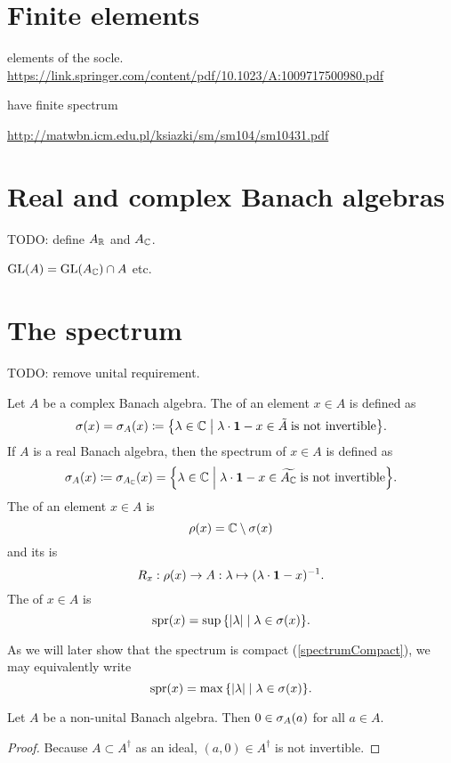 \section{Finite elements}
elements of the socle. \url{https://link.springer.com/content/pdf/10.1023/A:1009717500980.pdf}

have finite spectrum 

\url{http://matwbn.icm.edu.pl/ksiazki/sm/sm104/sm10431.pdf}

\section{Real and complex Banach algebras}
TODO: define $A_{\mathbb{R}}$ and $A_{\mathbb{C}}$.

\begin{proposition} \label{preservationAlgebraicPropertiesComplexificationRealification}
$\operatorname{GL}(A) = \operatorname{GL}(A_{\mathbb{C}})\cap A$ etc.
\end{proposition}

\section{The spectrum}
TODO: remove unital requirement.
\begin{definition}
Let $A$ be a complex Banach algebra. The  of an element $x\in A$ is defined as
\[ \spec(x) = \spec_A(x) \defeq \setbuilder{\lambda\in\C}{\lambda\cdot \vec{1} - x \in \tilde{A} \;\text{is not invertible}}. \]
If $A$ is a real Banach algebra, then the spectrum of $x\in A$ is defined as
\[ \spec_A(x) \defeq \spec_{A_\C}(x) = \setbuilder{\lambda\in\C}{\lambda\cdot \vec{1} - x \in \widetilde{A_\C} \;\text{is not invertible}}.  \]
The  of an element $x\in A$ is
\[ \rho(x) = \mathbb{C}\setminus\sigma(x) \]
and its  is
\[ R_x: \rho(x) \to A : \lambda\mapsto (\lambda\cdot\boldsymbol{\mathrm{1}}  - x)^{-1}. \]
The  of $x\in A$ is
\[ \spr(x) = \sup\setbuilder{|\lambda|}{\lambda\in\spec(x)}. \]
\end{definition}
As we will later show that the spectrum is compact (\ref{spectrumCompact}), we may equivalently write
\[ \spr(x) = \max\setbuilder{|\lambda|}{\lambda\in\spec(x)}. \]

\begin{lemma}
Let $A$ be a non-unital Banach algebra. Then $0\in\sigma_A(a)$ for all $a\in A$.
\end{lemma}
\begin{proof}
Because $A\subset A^\dagger$ as an ideal, $(a,0)\in A^\dagger$ is not invertible.
\end{proof}

